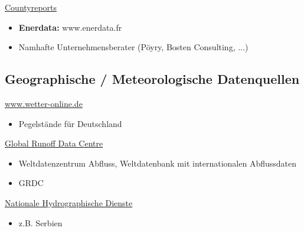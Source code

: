 \underline{Countyreports}
\begin{itemize}
    \item \textbf{Enerdata:} www.enerdata.fr
    \item Namhafte Unternehmensberater (Pöyry, Bosten Consulting, ...)
  
\end{itemize}



\subsection{Geographische / Meteorologische Datenquellen}
\label{geographische / meteorologische datenquellen}

\underline{www.wetter-online.de}
\begin{itemize}
    \item Pegelstände für Deutschland
\end{itemize}

\underline{Global Runoff Data Centre}
\begin{itemize}
    \item Weltdatenzentrum Abfluss, Weltdatenbank mit internationalen Abflussdaten
    \item GRDC
\end{itemize}

\underline{Nationale Hydrographische Dienste}
\begin{itemize}
    \item z.B. Serbien
\end{itemize}
